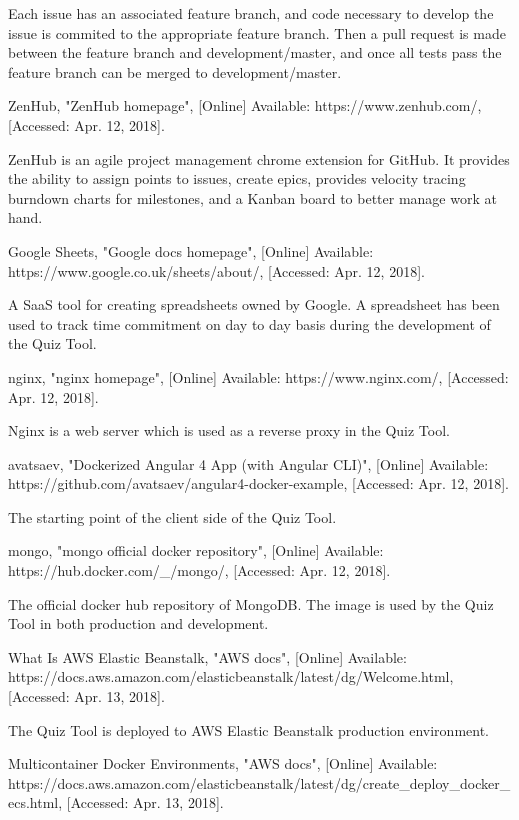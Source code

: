 \documentclass[11pt,a4paper]{report}
\begin{document}
\begin{thebibliography}{1}
    Each issue has an associated feature branch, and code necessary to develop the issue is commited to the appropriate feature branch.
    Then a pull request is made between the feature branch and development/master, and once all tests pass the feature branch can
    be merged to development/master.

 ZenHub, "ZenHub homepage", [Online] Available: https://www.zenhub.com/, [Accessed: Apr. 12, 2018].

    ZenHub is an agile project management chrome extension for GitHub. It provides the ability to assign points
    to issues, create epics, provides velocity tracing burndown charts for milestones, and a Kanban board to
    better manage work at hand.

 Google Sheets, "Google docs homepage", [Online] Available: https://www.google.co.uk/sheets/about/, [Accessed: Apr. 12, 2018].

  A SaaS tool for creating spreadsheets owned by Google. A spreadsheet has been used to track time commitment on day to day basis during
  the development of the Quiz Tool.

 nginx, "nginx homepage", [Online] Available: https://www.nginx.com/, [Accessed: Apr. 12, 2018].

  Nginx is a web server which is used as a reverse proxy in the Quiz Tool.

 avatsaev, "Dockerized Angular 4 App (with Angular CLI)", [Online] Available: https://github.com/avatsaev/angular4-docker-example, [Accessed: Apr. 12, 2018].

    The starting point of the client side of the Quiz Tool.

 mongo, "mongo official docker repository", [Online] Available: https://hub.docker.com/\_/mongo/, [Accessed: Apr. 12, 2018].

    The official docker hub repository of MongoDB. The image is used by the Quiz Tool in both production and development.

 What Is AWS Elastic Beanstalk, "AWS docs", [Online] Available: https://docs.aws.amazon.com/elasticbeanstalk/latest/dg/Welcome.html, [Accessed: Apr. 13, 2018].

    The Quiz Tool is deployed to AWS Elastic Beanstalk production environment.

 Multicontainer Docker Environments, "AWS docs", [Online] Available: https://docs.aws.amazon.com/elasticbeanstalk/latest/dg/create\_deploy\_docker\_ecs.html, [Accessed: Apr. 13, 2018].


\end{thebibliography}
\end{document}
